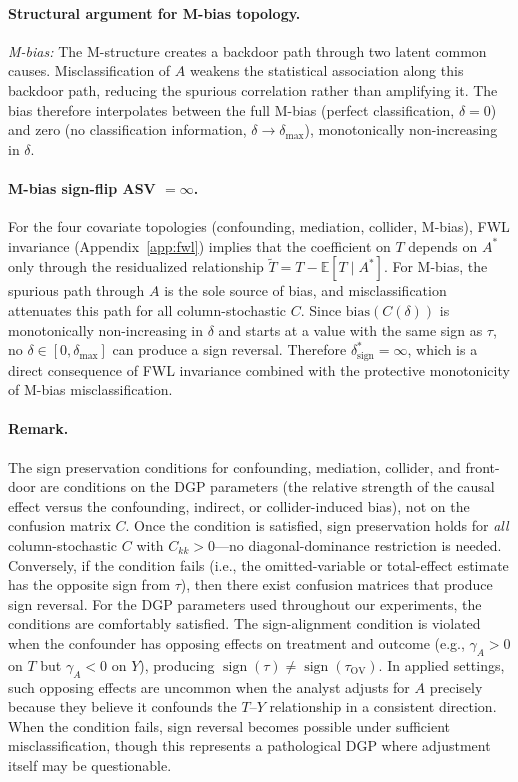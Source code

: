 \paragraph{Structural argument for M-bias topology.}
\emph{M-bias:} The M-structure creates a backdoor path through two latent common causes.
Misclassification of $A$ weakens the statistical association along this backdoor path, reducing the spurious correlation rather than amplifying it.
The bias therefore interpolates between the full M-bias (perfect classification, $\delta{=}0$) and zero (no classification information, $\delta{\to}\delta_{\max}$), monotonically non-increasing in $\delta$.

\paragraph{M-bias sign-flip ASV $= \infty$.}
For the four covariate topologies (confounding, mediation, collider, M-bias), FWL invariance (Appendix~\ref{app:fwl}) implies that the coefficient on $T$ depends on $A^*$ only through the residualized relationship $\tilde{T} = T - \mathbb{E}[T \mid A^*]$. For M-bias, the spurious path through $A$ is the sole source of bias, and misclassification attenuates this path for all column-stochastic $C$. Since $\text{bias}(C(\delta))$ is monotonically non-increasing in $\delta$ and starts at a value with the same sign as $\tau$, no $\delta \in [0, \delta_{\max}]$ can produce a sign reversal. Therefore $\delta^*_{\text{sign}} = \infty$, which is a direct consequence of FWL invariance combined with the protective monotonicity of M-bias misclassification.

\paragraph{Remark.}
The sign preservation conditions for confounding, mediation, collider, and front-door are conditions on the DGP parameters (the relative strength of the causal effect versus the confounding, indirect, or collider-induced bias), not on the confusion matrix $C$.
Once the condition is satisfied, sign preservation holds for \emph{all} column-stochastic $C$ with $C_{kk}>0$---no diagonal-dominance restriction is needed.
Conversely, if the condition fails (i.e., the omitted-variable or total-effect estimate has the opposite sign from $\tau$), then there exist confusion matrices that produce sign reversal.
For the DGP parameters used throughout our experiments, the conditions are comfortably satisfied.
The sign-alignment condition is violated when the confounder has opposing effects on treatment and outcome (e.g., $\gamma_A > 0$ on $T$ but $\gamma_A < 0$ on $Y$), producing $\operatorname{sign}(\tau) \neq \operatorname{sign}(\tau_{\mathrm{OV}})$. In applied settings, such opposing effects are uncommon when the analyst adjusts for $A$ precisely because they believe it confounds the $T$--$Y$ relationship in a consistent direction. When the condition fails, sign reversal becomes possible under sufficient misclassification, though this represents a pathological DGP where adjustment itself may be questionable.

